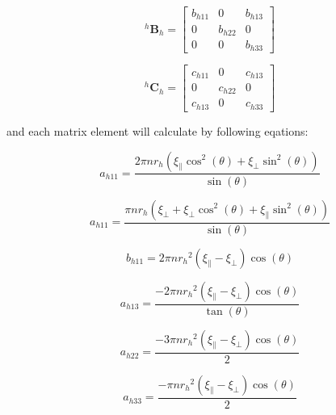 \documentclass[12pt,a4paper,titlepage]{report}
\begin{document}
\begin{equation}
 ^{h}\bm{B}_h = \begin{bmatrix}
       b_{h11}  & 0 		 & b_{h13}          \\[0.3em]
       0		 & b_{h22}           & 0\\[0.3em]
       0           	& 0 		& b_{h33}
     \end{bmatrix}
\label{Bmatrix}
\end{equation}



\begin{equation}
 ^{h}\bm{C}_h = \begin{bmatrix}
       c_{h11}  & 0 		 & c_{h13}            \\[0.3em]
       0		 & c_{h22}           & 0\\[0.3em]
       c_{h13}            	& 0 		& c_{h33} 
     \end{bmatrix}
\label{Cmatrix}
\end{equation}


and each matrix element will calculate by following eqations:



\begin{equation}
a_{h11} = \frac{2\pi n r_h (\xi_{\parallel} \cos^2(\theta) + \xi_{\perp} \sin^2(\theta))}{\sin(\theta) }
\label{ah11}
\end{equation} 

\begin{equation}
a_{h11} = \frac{\pi n r_h (\xi_{\perp} + \xi_{\perp} \cos^2(\theta) + \xi_{\parallel} \sin^2(\theta))}{\sin(\theta) }
\label{ah22}
\end{equation} 

\begin{equation}
b_{h11} = 2\pi n {r_h}^2 (\xi_{\parallel} - \xi_{\perp})\cos(\theta)
\label{bh11}
\end{equation} 


\begin{equation}
a_{h13} = \frac{-2 \pi n {r_h}^2 (\xi_{\parallel} - \xi_{\perp})\cos(\theta)}{\tan(\theta) }
\label{bh13}
\end{equation} 


\begin{equation}
a_{h22} = \frac{-3 \pi n {r_h}^2 (\xi_{\parallel} - \xi_{\perp})\cos(\theta)}{2}
\label{bh22}
\end{equation} 


\begin{equation}
a_{h33} = \frac{- \pi n {r_h}^2 (\xi_{\parallel} - \xi_{\perp})\cos(\theta)}{2}
\label{bh33}
\end{equation} 
\end{document}
